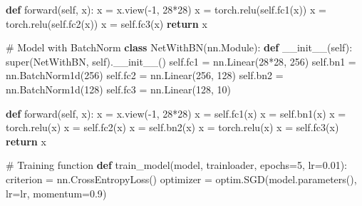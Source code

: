 \documentclass[
  letterpaper,
  DIV=11,
  numbers=noendperiod]{scrreprt}
\newenvironment{Shaded}{\begin{snugshade}}{\end{snugshade}}
\newcommand{\BuiltInTok}[1]{\textcolor[rgb]{0.00,0.23,0.31}{#1}}
\newcommand{\CommentTok}[1]{\textcolor[rgb]{0.37,0.37,0.37}{#1}}
\newcommand{\ControlFlowTok}[1]{\textcolor[rgb]{0.00,0.23,0.31}{\textbf{#1}}}
\newcommand{\DecValTok}[1]{\textcolor[rgb]{0.68,0.00,0.00}{#1}}
\newcommand{\FloatTok}[1]{\textcolor[rgb]{0.68,0.00,0.00}{#1}}
\newcommand{\FunctionTok}[1]{\textcolor[rgb]{0.28,0.35,0.67}{#1}}
\newcommand{\KeywordTok}[1]{\textcolor[rgb]{0.00,0.23,0.31}{\textbf{#1}}}
\newcommand{\NormalTok}[1]{\textcolor[rgb]{0.00,0.23,0.31}{#1}}
\newcommand{\OperatorTok}[1]{\textcolor[rgb]{0.37,0.37,0.37}{#1}}
\newcommand{\VariableTok}[1]{\textcolor[rgb]{0.07,0.07,0.07}{#1}}
\begin{document}
\begin{Shaded}
\begin{Highlighting}[]
    \KeywordTok{def}\NormalTok{ forward(}\VariableTok{self}\NormalTok{, x):}
\NormalTok{        x }\OperatorTok{=}\NormalTok{ x.view(}\OperatorTok{{-}}\DecValTok{1}\NormalTok{, }\DecValTok{28}\OperatorTok{*}\DecValTok{28}\NormalTok{)}
\NormalTok{        x }\OperatorTok{=}\NormalTok{ torch.relu(}\VariableTok{self}\NormalTok{.fc1(x))}
\NormalTok{        x }\OperatorTok{=}\NormalTok{ torch.relu(}\VariableTok{self}\NormalTok{.fc2(x))}
\NormalTok{        x }\OperatorTok{=} \VariableTok{self}\NormalTok{.fc3(x)}
        \ControlFlowTok{return}\NormalTok{ x}

\CommentTok{\# Model with BatchNorm}
\KeywordTok{class}\NormalTok{ NetWithBN(nn.Module):}
    \KeywordTok{def} \FunctionTok{\_\_init\_\_}\NormalTok{(}\VariableTok{self}\NormalTok{):}
        \BuiltInTok{super}\NormalTok{(NetWithBN, }\VariableTok{self}\NormalTok{).}\FunctionTok{\_\_init\_\_}\NormalTok{()}
        \VariableTok{self}\NormalTok{.fc1 }\OperatorTok{=}\NormalTok{ nn.Linear(}\DecValTok{28}\OperatorTok{*}\DecValTok{28}\NormalTok{, }\DecValTok{256}\NormalTok{)}
        \VariableTok{self}\NormalTok{.bn1 }\OperatorTok{=}\NormalTok{ nn.BatchNorm1d(}\DecValTok{256}\NormalTok{)}
        \VariableTok{self}\NormalTok{.fc2 }\OperatorTok{=}\NormalTok{ nn.Linear(}\DecValTok{256}\NormalTok{, }\DecValTok{128}\NormalTok{)}
        \VariableTok{self}\NormalTok{.bn2 }\OperatorTok{=}\NormalTok{ nn.BatchNorm1d(}\DecValTok{128}\NormalTok{)}
        \VariableTok{self}\NormalTok{.fc3 }\OperatorTok{=}\NormalTok{ nn.Linear(}\DecValTok{128}\NormalTok{, }\DecValTok{10}\NormalTok{)}
        
    \KeywordTok{def}\NormalTok{ forward(}\VariableTok{self}\NormalTok{, x):}
\NormalTok{        x }\OperatorTok{=}\NormalTok{ x.view(}\OperatorTok{{-}}\DecValTok{1}\NormalTok{, }\DecValTok{28}\OperatorTok{*}\DecValTok{28}\NormalTok{)}
\NormalTok{        x }\OperatorTok{=} \VariableTok{self}\NormalTok{.fc1(x)}
\NormalTok{        x }\OperatorTok{=} \VariableTok{self}\NormalTok{.bn1(x)}
\NormalTok{        x }\OperatorTok{=}\NormalTok{ torch.relu(x)}
\NormalTok{        x }\OperatorTok{=} \VariableTok{self}\NormalTok{.fc2(x)}
\NormalTok{        x }\OperatorTok{=} \VariableTok{self}\NormalTok{.bn2(x)}
\NormalTok{        x }\OperatorTok{=}\NormalTok{ torch.relu(x)}
\NormalTok{        x }\OperatorTok{=} \VariableTok{self}\NormalTok{.fc3(x)}
        \ControlFlowTok{return}\NormalTok{ x}

\CommentTok{\# Training function}
\KeywordTok{def}\NormalTok{ train\_model(model, trainloader, epochs}\OperatorTok{=}\DecValTok{5}\NormalTok{, lr}\OperatorTok{=}\FloatTok{0.01}\NormalTok{):}
\NormalTok{    criterion }\OperatorTok{=}\NormalTok{ nn.CrossEntropyLoss()}
\NormalTok{    optimizer }\OperatorTok{=}\NormalTok{ optim.SGD(model.parameters(), lr}\OperatorTok{=}\NormalTok{lr, momentum}\OperatorTok{=}\FloatTok{0.9}\NormalTok{)}
    

\end{Highlighting}
\end{Shaded}
\end{document}
